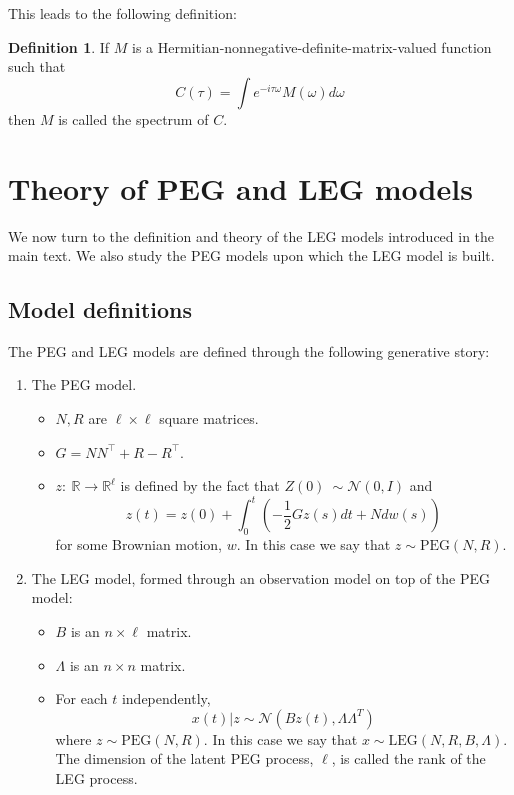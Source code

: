 \documentclass{article}
\theoremstyle{definition}
\newtheorem*{definition*}{Definition}
\newcommand{\LEG}{\mathrm{LEG}}
\newcommand{\PEG}{\mathrm{PEG}}
\begin{document}
This leads to the following definition:

\begin{definition*}
If $M$ is a Hermitian-nonnegative-definite-matrix-valued function such that
\[
C(\tau) = \int e^{-i \tau \omega} M(\omega) d\omega 
\]
then $M$ is called the spectrum of $C$.  
\end{definition*}


                                                 


\section{Theory of PEG and LEG models}

We now turn to the definition and theory of the LEG models introduced in the main text.  We also study the  PEG models upon which the LEG model is built.

\subsection{Model definitions}

The PEG and LEG models are defined through the following generative story:
\begin{enumerate}
    \item The PEG model.
    \begin{itemize}
        \item $N,R$ are $\ell \times \ell$ square matrices.
        \item $G = N N^\top + R -R^\top$.
        \item $z:\ \mathbb{R} \rightarrow \mathbb{R}^\ell$ is defined by the fact that $Z(0)\ \sim \mathcal{N}(0,I)$ and
        \[
        z(t) = z(0)+\int_0^t \left(-\frac{1}{2} G z(s) dt + N dw(s)\right)
        \]
        for some Brownian motion, $w$.  In this case we say that $z \sim \PEG(N,R)$.
    \end{itemize}
    \item The LEG model, formed through an observation model on top of the PEG model:
    \begin{itemize}
        \item $B$ is an $n\times \ell$ matrix.
        \item $\Lambda$ is an $n \times n$ matrix.
        \item For each $t$ independently,
        \[
        x(t)|z \sim \mathcal N(B z(t), \Lambda \Lambda ^T)
        \]
        where $z \sim \PEG(N,R)$.  In this case we say that $x \sim \LEG(N,R,B,\Lambda)$.  The dimension of the latent PEG process, $\ell$, is called the rank of the LEG process.
    \end{itemize}
\end{enumerate}
\end{document}
